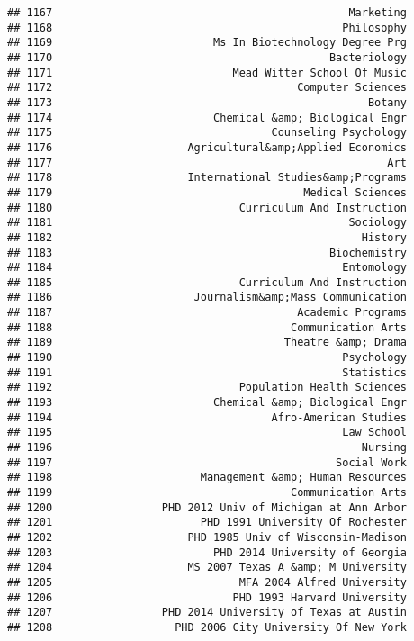 \documentclass[
]{article}
\begin{document}
\begin{verbatim}
## 1167                                              Marketing
## 1168                                             Philosophy
## 1169                         Ms In Biotechnology Degree Prg
## 1170                                           Bacteriology
## 1171                            Mead Witter School Of Music
## 1172                                      Computer Sciences
## 1173                                                 Botany
## 1174                         Chemical &amp; Biological Engr
## 1175                                  Counseling Psychology
## 1176                     Agricultural&amp;Applied Economics
## 1177                                                    Art
## 1178                     International Studies&amp;Programs
## 1179                                       Medical Sciences
## 1180                             Curriculum And Instruction
## 1181                                              Sociology
## 1182                                                History
## 1183                                           Biochemistry
## 1184                                             Entomology
## 1185                             Curriculum And Instruction
## 1186                      Journalism&amp;Mass Communication
## 1187                                      Academic Programs
## 1188                                     Communication Arts
## 1189                                    Theatre &amp; Drama
## 1190                                             Psychology
## 1191                                             Statistics
## 1192                             Population Health Sciences
## 1193                         Chemical &amp; Biological Engr
## 1194                                  Afro-American Studies
## 1195                                             Law School
## 1196                                                Nursing
## 1197                                            Social Work
## 1198                       Management &amp; Human Resources
## 1199                                     Communication Arts
## 1200                 PHD 2012 Univ of Michigan at Ann Arbor
## 1201                       PHD 1991 University Of Rochester
## 1202                     PHD 1985 Univ of Wisconsin-Madison
## 1203                         PHD 2014 University of Georgia
## 1204                     MS 2007 Texas A &amp; M University
## 1205                             MFA 2004 Alfred University
## 1206                            PHD 1993 Harvard University
## 1207                 PHD 2014 University of Texas at Austin
## 1208                   PHD 2006 City University Of New York

\end{verbatim}
\end{document}
